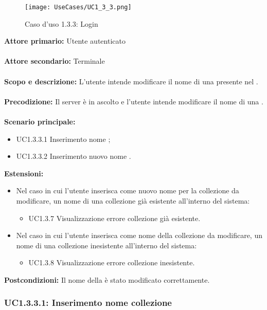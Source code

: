 \documentclass{scalatekids-article}
\begin{document}
\begin{figure}[H]
  \begin{center}
    \texttt{[image: UseCases/UC1\_3\_3.png]}
    \caption*{Caso d'uso 1.3.3: Login}
  \end{center}
\end{figure}
\textbf{Attore primario:} Utente autenticato\\ \\
\textbf{Attore secondario:} Terminale\\ \\
\textbf{Scopo e descrizione:} L’utente intende modificare il nome di una  presente nel .\\ \\
\textbf{Precodizione:} Il server è in ascolto e l’utente intende modificare il nome di una .\\ \\
\textbf{Scenario principale:}
\begin{itemize}
  \item UC1.3.3.1 Inserimento nome ;
  \item UC1.3.3.2 Inserimento nuovo nome .
\end{itemize}
\textbf{Estensioni:}
\begin{itemize}
  \item Nel caso in cui l'utente inserisca come nuovo nome per la collezione da modificare, un nome di una collezione già esistente all'interno del sistema:
  \begin{itemize}
    \item UC1.3.7 Visualizzazione errore collezione già esistente.
  \end{itemize}
  \item Nel caso in cui l'utente inserisca come nome della collezione da modificare, un nome di una collezione inesistente all'interno del sistema:
  \begin{itemize}
    \item UC1.3.8 Visualizzazione errore collezione inesistente.
  \end{itemize}
\end{itemize}
\textbf{Postcondizioni:} Il nome della  è stato modificato correttamente.

\subsubsection{UC1.3.3.1: Inserimento nome collezione}
\end{document}

